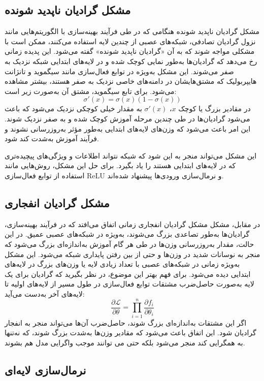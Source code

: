 \subsection{مشکل گرادیان ناپدید شونده}
مشکل گرادیان ناپدید شونده%
هنگامی که در طی فرآیند بهینه‌سازی با الگوریتم‌هایی مانند نزول گرادیان تصادفی، شبکه‌های عصبی از چندین لایه استفاده می‌کنند، ممکن است با مشکلی مواجه شوند که به آن «گرادیان ناپدید شونده» گفته می‌شود. این پدیده زمانی رخ می‌دهد که گرادیان‌ها به‌طور نمایی کوچک شده و در لایه‌های ابتدایی شبکه نزدیک به صفر می‌شوند. این مشکل به‌ویژه در توابع فعال‌سازی مانند سیگموید و تانژانت هایپربولیک که مشتق‌هایشان در دامنه‌های خاصی نزدیک به صفر هستند، بیشتر مشاهده می‌شود. برای تابع سیگموید، مشتق آن به‌صورت زیر است:
$$
\sigma'(x) = \sigma(x)(1 - \sigma(x))
$$
در مقادیر بزرگ یا کوچک $x$، $\sigma'(x)$ به مقدار خیلی کوچکی نزدیک می‌شود که باعث می‌شود گرادیان‌ها در طی چندین مرحله آموزش کوچک شده و به صفر نزدیک شوند. این امر باعث می‌شود که وزن‌های لایه‌های ابتدایی به‌طور مؤثر به‌روزرسانی نشوند و فرآیند آموزش به‌شدت کند شود.

این مشکل می‌تواند منجر به این شود که شبکه نتواند اطلاعات و ویژگی‌های پیچیده‌تری که در لایه‌های ابتدایی هستند را یاد بگیرد. برای حل این مشکل، روش‌هایی مانند استفاده از توابع فعال‌سازی ReLU و نرمال‌سازی ورودی‌ها پیشنهاد شده‌اند.

\subsection{مشکل گرادیان انفجاری}
در مقابل، مشکل مشکل گرادیان انفجاری%
زمانی اتفاق می‌افتد که در فرآیند بهینه‌سازی، گرادیان‌ها به‌طور تصاعدی بزرگ می‌شوند، به‌ویژه در شبکه‌های عصبی عمیق. در این حالت، مقدار به‌روزرسانی وزن‌ها در طی هر گام آموزش به‌اندازه‌ای بزرگ می‌شود که منجر به نوسانات شدید در وزن‌ها و حتی از بین رفتن پایداری شبکه می‌شود. این مشکل به‌ویژه زمانی در شبکه‌های عصبی با تعداد زیادی لایه یا وزن‌های بزرگ در لایه‌های ابتدایی دیده می‌شود. برای فهم بهتر این موضوع، در نظر بگیرید که گرادیان برای یک لایه به‌صورت حاصل‌ضرب مشتقات توابع فعال‌سازی در طول مسیر از لایه‌های اولیه تا لایه‌های آخر به‌دست می‌آید:
$$
\frac{\partial \mathcal{L}}{\partial \theta} = \prod_{i=1}^{n} \frac{\partial f_i}{\partial \theta_i}
$$
اگر این مشتقات به‌اندازه‌ای بزرگ شوند، حاصل‌ضرب آن‌ها می‌تواند منجر به انفجار گرادیان شود. این اتفاق باعث می‌شود که مقادیر وزن‌ها به‌شدت بزرگ شوند، که نه‌تنها به همگرایی کند منجر می‌شود بلکه حتی می توانند موجب واگرایی مدل هم بشوند.


\subsection{نرمال‌سازی لایه‌ای}

